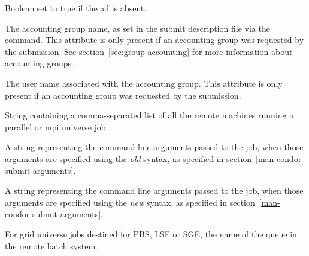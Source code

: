 \begin{description}


\item[\AdAttr{Absent}:] Boolean set to true  if the ad is absent.

\item[\AdAttr{AcctGroup}:] The accounting group name, as set in the
submit description file via the  command.
This attribute is only present if an accounting group was requested by the
submission. See section~\ref{sec:group-accounting} for more 
information about accounting groups.

\item[\AdAttr{AcctGroupUser}:] The user name associated with the
accounting group.  This attribute is only present if an
accounting group was requested by the submission.

\item[\AdAttr{AllRemoteHosts}:]  String containing a comma-separated list
of all the remote machines running a parallel or mpi universe job.

\item[\AdAttr{Args}:]  A string representing the command line arguments 
passed to the job, when those arguments are specified using the
\emph{old} syntax, as specified in section~\ref{man-condor-submit-arguments}.

\item[\AdAttr{Arguments}:]  A string representing the command line arguments 
passed to the job, when those arguments are specified using the
\emph{new} syntax, as specified in section~\ref{man-condor-submit-arguments}.

\item[\AdAttr{BatchQueue}:]  For grid universe jobs destined for 
PBS, LSF or SGE, the name of the queue in the remote batch system.


\end{description}
